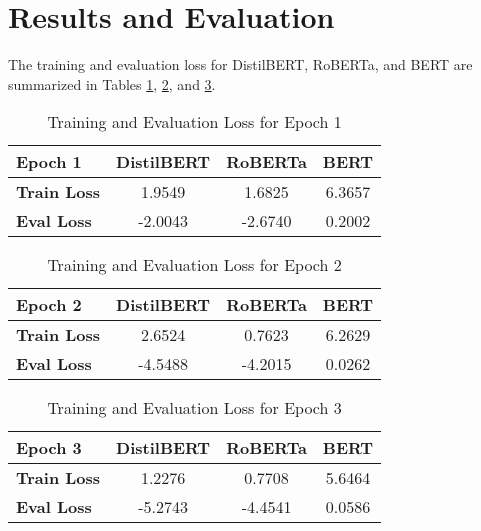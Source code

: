 \documentclass[conference]{IEEEtran}
\begin{document}
\section{Results and Evaluation}

    The training and evaluation loss for DistilBERT, RoBERTa, and BERT are summarized in Tables \ref{tab:losses-epoch1}, \ref{tab:losses-epoch2}, and \ref{tab:losses-epoch3}.

    \begin{table}[h]
        \centering
        \begin{tabular}{|l|c|c|c|}
            \hline
            \textbf{Epoch 1} & \textbf{DistilBERT} & \textbf{RoBERTa} & \textbf{BERT} \\ \hline
            \textbf{Train Loss} & 1.9549 & 1.6825 & 6.3657 \\ \hline
            \textbf{Eval Loss} & -2.0043 & -2.6740 & 0.2002 \\ \hline
        \end{tabular}
        \caption{Training and Evaluation Loss for Epoch 1}
        \label{tab:losses-epoch1}
    \end{table}

    \begin{table}[h]
        \centering
        \begin{tabular}{|l|c|c|c|}
            \hline
            \textbf{Epoch 2} & \textbf{DistilBERT} & \textbf{RoBERTa} & \textbf{BERT} \\ \hline
            \textbf{Train Loss} & 2.6524 & 0.7623 & 6.2629 \\ \hline
            \textbf{Eval Loss} & -4.5488 & -4.2015 & 0.0262 \\ \hline
        \end{tabular}
        \caption{Training and Evaluation Loss for Epoch 2}
        \label{tab:losses-epoch2}
    \end{table}

    \begin{table}[h]
        \centering
        \begin{tabular}{|l|c|c|c|}
            \hline
            \textbf{Epoch 3} & \textbf{DistilBERT} & \textbf{RoBERTa} & \textbf{BERT} \\ \hline
            \textbf{Train Loss} & 1.2276 & 0.7708 & 5.6464 \\ \hline
            \textbf{Eval Loss} & -5.2743 & -4.4541 & 0.0586 \\ \hline
        \end{tabular}
        \caption{Training and Evaluation Loss for Epoch 3}
        \label{tab:losses-epoch3}
    \end{table}
\end{document}
